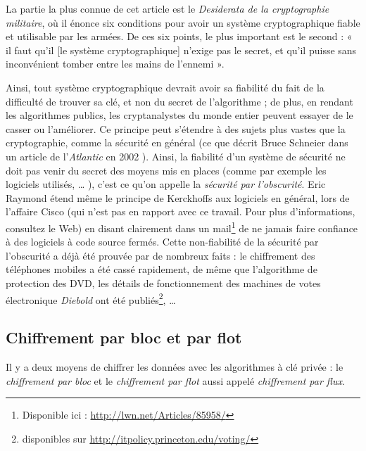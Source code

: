 La partie la plus connue de cet article est le
\emph{Desiderata de la cryptographie militaire}, où il énonce six
conditions pour avoir un système cryptographique fiable et utilisable
par les armées. De ces six points, le plus important est le second : «
il faut qu’il [le système cryptographique] n’exige pas le secret, et
qu’il puisse sans inconvénient tomber entre les mains de l’ennemi
». 

Ainsi, tout système cryptographique devrait avoir sa fiabilité du
fait de la
difficulté de trouver sa clé, et non du secret de l'algorithme ; de
plus, en rendant les algorithmes publics, les cryptanalystes du monde
entier peuvent essayer de le casser ou l'améliorer. Ce principe peut
s'étendre à des sujets plus vastes que la cryptographie, comme la
sécurité en général (ce que décrit Bruce Schneier dans un article de
l'\emph{Atlantic} en 2002 \cite{HomelandInsecurity}). Ainsi, la
fiabilité d'un système de sécurité ne doit pas venir du secret des
moyens mis en places (comme par exemple les logiciels utilisés, \dots
), c'est ce qu'on appelle la \emph{sécurité par l'obscurité}. Eric
Raymond étend même le principe de Kerckhoffs aux logiciels en
général,
lors de l'affaire Cisco (qui n'est pas en rapport avec ce travail.
Pour plus d'informations, consultez le Web) en disant clairement dans
un mail\footnote{Disponible ici :
  \url{http://lwn.net/Articles/85958/}} de ne jamais faire confiance à
des logiciels à code source fermés. Cette non-fiabilité de la
sécurité par l'obscurité a déjà été prouvée par de nombreux faits : le
chiffrement des téléphones mobiles a été cassé rapidement, de même que
l'algorithme de protection des DVD, les détails de
fonctionnement des machines de votes électronique \emph{Diebold} ont été
publiés\footnote{disponibles sur \url{http://itpolicy.princeton.edu/voting/}}, \dots

\subsection{Chiffrement par bloc et par flot}
Il y a deux moyens de chiffrer les données avec les algorithmes à clé
privée : le \emph{chiffrement par bloc} et le \emph{chiffrement
par flot} aussi appelé \emph{chiffrement par flux}. \\

